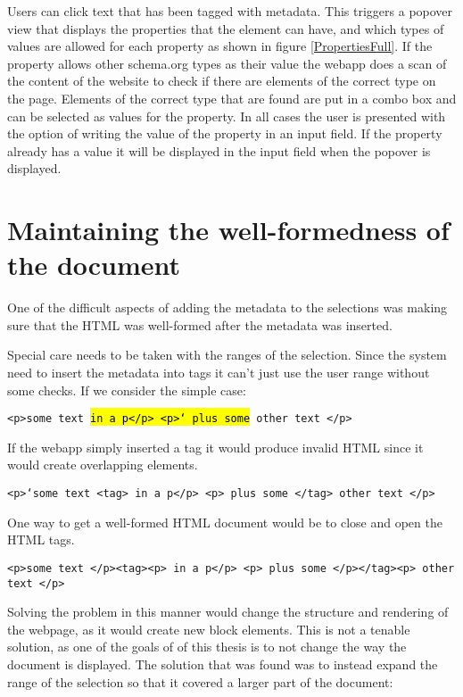 Users can click text that has been tagged with metadata.
This triggers a popover view that displays the properties that the element can have,
and which types of values are allowed for each property as shown in figure \ref{PropertiesFull}.
If the property allows other schema.org types as their value the webapp does a scan of the content of the website to check if
there are elements of the correct type on the page.
Elements of the correct type that are found are put in a combo box and can be selected as values for the property.
In all cases the user is presented with the option of writing the value of the property in an input field.
If the property already has a value it will be displayed in the input field when the popover is displayed.


\section{Maintaining the well-formedness of the document}
One of the difficult aspects of adding the metadata to the selections was making sure that the HTML was well-formed
after the metadata was inserted.

Special care needs to be taken with the ranges of the selection.
Since the system need to insert the metadata into tags it can't just use the user range without some checks.
If we consider the simple case:

\texttt{<p>some text \hl{in a p</p> <p>` plus some} other text </p>}

If the webapp simply inserted a tag it would produce invalid HTML since it would create overlapping elements.

\texttt{<p>`some text <tag> in a p</p> <p> plus some </tag>  other text </p>}

One way to get a well-formed HTML document would be to close and open the HTML tags.

\texttt{<p>some text </p><tag><p> in a p</p> <p> plus some </p></tag><p>  other text </p>}

Solving the problem in this manner would change the structure and rendering of the webpage,
as it would create new block elements.
This is not a tenable solution, as one of the goals of of this thesis is to not change the way the document is displayed.
The solution that was found was to instead expand the range of the selection so that it covered a larger part of the document:


